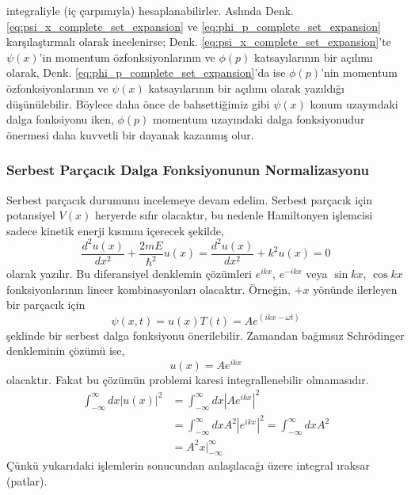 \documentclass[00_kitap.tex]{subfiles}
\begin{document}
integraliyle (iç çarpımıyla) hesaplanabilirler. Aslında Denk. \ref{eq:psi_x_complete_set_expansion} ve \ref{eq:phi_p_complete_set_expansion} karşılaştırmalı olarak incelenirse; Denk. \ref{eq:psi_x_complete_set_expansion}'te $\psi(x)$'in momentum özfonksiyonlarının ve $\phi(p)$ katsayılarının bir açılımı olarak, Denk. \ref{eq:phi_p_complete_set_expansion}'da ise $\phi(p)$'nin momentum özfonksiyonlarının ve $\psi(x)$ katsayılarının bir açılımı olarak yazıldığı düşünülebilir. Böylece daha önce de bahsettiğimiz gibi $\psi(x)$ konum uzayındaki dalga fonksiyonu iken, $\phi(p)$ momentum uzayındaki dalga fonksiyonudur önermesi daha kuvvetli bir dayanak kazanmış olur.

\subsubsection{Serbest Parçacık Dalga Fonksiyonunun Normalizasyonu}

Serbest parçacık durumunu incelemeye devam edelim. Serbest parçacık için potansiyel $V(x)$ heryerde sıfır olacaktır, bu nedenle Hamiltonyen işlemcisi sadece kinetik enerji kısmını içerecek şekilde,
\begin{equation}
\frac { d ^ { 2 } u ( x ) } { d x ^ { 2 } } + \frac { 2 m E } { \hbar ^ { 2 } } u ( x ) = \frac { d ^ { 2 } u ( x ) } { d x ^ { 2 } } + k ^ { 2 } u ( x ) = 0
\label{eq:freeParticle_schEq}
\end{equation}
olarak yazılır. Bu diferansiyel denklemin çözümleri $e ^ { i k x }$, $e ^ { - i k x }$ veya $\sin kx$, $\cos kx$ fonksiyonlarının lineer kombinasyonları olacaktır. Örneğin, $+x$ yönünde ilerleyen bir parçacık için
\begin{equation}
\psi(x,t) = u(x) T(t) = A e ^ { (i k x -\omega t)}
\end{equation}
şeklinde bir serbest dalga fonksiyonu önerilebilir. Zamandan bağımsız Schrödinger denkleminin çözümü ise,
\begin{equation}
u(x) = A e ^ { i k x }
\end{equation}
olacaktır. Fakat bu çözümün problemi karesi integrallenebilir olmamasıdır.
\begin{align}
\int _ { - \infty } ^ { \infty } d x \left|u(x) \right| ^ { 2 } 
&= \int _ { - \infty } ^ { \infty } d x \left|A e ^ { i k x } \right|^2 \nonumber\\
&= \int _ { - \infty } ^ { \infty } d x A^2 \left|e ^ { i k x } \right|^2
= \int _ { - \infty } ^ { \infty } d x A^2 \nonumber\\
&= A^2 x\bigg|_{-\infty}^\infty
\end{align}
Çünkü yukarıdaki işlemlerin sonucundan anlaşılacağı üzere integral ıraksar (patlar). 
\end{document}
